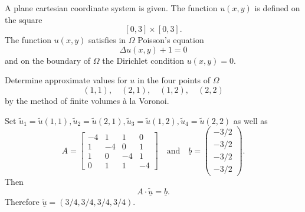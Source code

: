 A plane cartesian coordinate system is given.
The function $u(x,y)$ is defined on the square
\[
[0,3] \times [0,3].
\]
The function $u(x,y)$ satisfies in $\Omega$ Poisson's equation
\[
\Delta u(x,y) + 1 = 0
\]
and on the boundary of $\Omega$ the Dirichlet condition $u(x,y) = 0$.

Determine approximate values for $u$ in the four points of $\Omega$ 
\[
(1,1), \quad (2,1), \quad (1,2), \quad (2,2)
\]
by the method of finite volumes \`a la Voronoi.  

\begin{loesung}
Set $\tilde u_1 = \tilde u(1,1), \tilde u_2 = \tilde u(2,1), \tilde u_3 = \tilde u(1,2), \tilde u_4 = \tilde u(2,2)$
as well as
\[
A = \left[\begin{array}{rrrr} -4 & 1 & 1 & 0 \\ 1 & -4 & 0 & 1 \\ 1 & 0 &
  -4 & 1 \\ 0 & 1 & 1 & -4 \end{array}\right] \quad \text{and} \quad
  \underline{b} =  \left(\begin{array}{r} -3/2 \\ -3/2 \\ -3/2 \\ -3/2 \end{array}\right).
\]
Then 
\[
A \cdot \underline{\tilde u} = \underline{b}.
\]
Therefore $\underline{\tilde u} = (3/4, 3/4, 3/4, 3/4)$.
\end{loesung}

